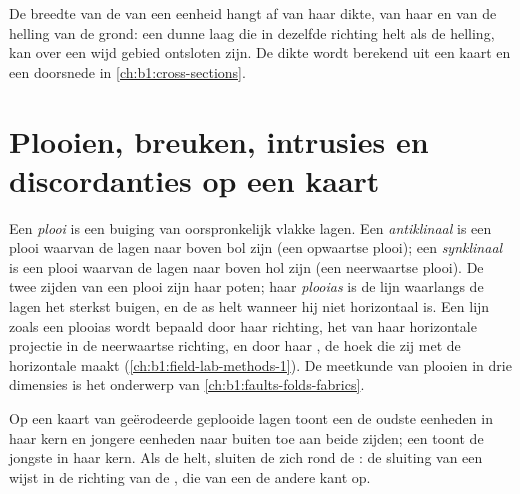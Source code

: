 \begin{remark}\label{rem:b1:geological-maps:width}
De breedte van de  van een eenheid hangt af van haar dikte, van haar  en van de
helling van de grond: een dunne laag die in dezelfde richting helt als de helling, kan over een wijd
gebied ontsloten zijn. De dikte wordt berekend uit een kaart en een doorsnede in
\cref{ch:b1:cross-sections}.
\end{remark}

\section{Plooien, breuken, intrusies en discordanties op een kaart}

\begin{definition}\label{def:b1:geological-maps:fold}
Een \emph{plooi} is een buiging van oorspronkelijk vlakke lagen. Een
\emph{antiklinaal} is een plooi waarvan de lagen naar boven bol zijn (een
opwaartse plooi); een \emph{synklinaal} is een plooi waarvan de lagen naar boven
hol zijn (een neerwaartse plooi). De twee zijden van een plooi zijn haar poten; haar
\emph{plooias} is de lijn waarlangs de lagen het sterkst buigen, en de as helt
wanneer hij niet horizontaal is. Een lijn zoals een plooias wordt bepaald door haar richting, het
 van haar horizontale projectie in de neerwaartse richting, en door haar , de hoek die
zij met de horizontale maakt (\cref{ch:b1:field-lab-methods-1}). De meetkunde van plooien in drie
dimensies is het onderwerp van \cref{ch:b1:faults-folds-fabrics}.
\end{definition}

\begin{proposition}[Plooipatronen]\label{prop:b1:geological-maps:folds}
Op een kaart van geërodeerde geplooide lagen toont een  de oudste eenheden in haar kern
en jongere eenheden naar buiten toe aan beide zijden; een  toont de jongste in haar kern.
Als de  helt, sluiten de  zich rond de : de sluiting van een 
wijst in de richting van de , die van een  de andere kant op.
\end{proposition}


